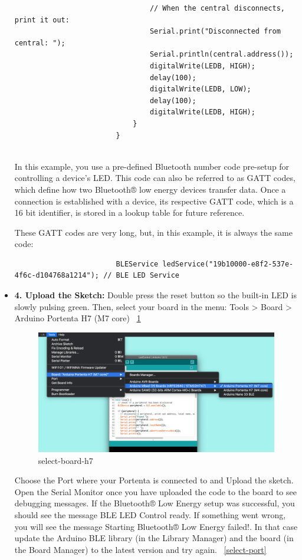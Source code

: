 \begin{itemize}
\begin{lstlisting}
								// When the central disconnects, print it out:
								Serial.print("Disconnected from central: ");
								Serial.println(central.address());    
								digitalWrite(LEDB, HIGH);
								delay(100);
								digitalWrite(LEDB, LOW);
								delay(100);
								digitalWrite(LEDB, HIGH);
							}
						}    
								
					\end{lstlisting}
					
					In this example, you use a pre-defined Bluetooth number code pre-setup for controlling a device's LED. This code can also be referred to as GATT codes, which define how two Bluetooth® low energy devices transfer data. Once a connection is established with a device, its respective GATT code, which is a 16 bit identifier, is stored in a lookup table for future reference.
					
					These GATT codes are very long, but, in this example, it is always the same code:
					\begin{lstlisting}
						BLEService ledService("19b10000-e8f2-537e-4f6c-d104768a1214"); // BLE LED Service
					\end{lstlisting}	
					
				\item \textbf{4. Upload the Sketch:} Double press the reset button so the built-in LED is slowly pulsing green. Then, select your board in the menu: Tools > Board > Arduino Portenta H7 (M7 core) ~\ref{select-board-h7}
					\begin{figure}
						\begin{center}
							\includegraphics[width=0.7\linewidth]{Images/PortentaH7/select-board-h7.png}
							\caption{select-board-h7}
							\label{select-board-h7}
						\end{center}
					\end{figure}
					
				Choose the Port where your Portenta is connected to and Upload the sketch. Open the Serial Monitor once you have uploaded the code to the board to see debugging messages. If the Bluetooth® Low Energy setup was successful, you should see the message BLE LED Control ready. If something went wrong, you will see the message Starting Bluetooth® Low Energy failed!. In that case update the Arduino BLE library (in the Library Manager) and the board (in the Board Manager) to the latest version and try again. ~\ref{select-port}
				

\end{itemize}
